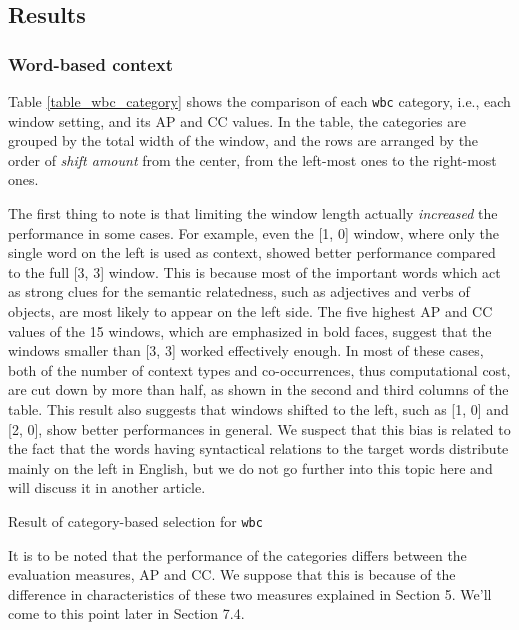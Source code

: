 \documentclass[english]{jnlp_1.4}
\begin{document}
\subsection{Results}

\subsubsection{Word-based context}

Table \ref{table_wbc_category} shows the comparison of each {\tt wbc}
category, i.e., each window setting, and its AP and CC values. In the
table, the categories are grouped by the total width of the window,
and the rows are arranged by the order of {\em shift amount} from the
center, from the left-most ones to the right-most ones.

The first thing to note is that limiting the window length actually
{\em increased} the performance in some cases. For example, even the
[1, 0] window, where only the single word on the left is used as
context, showed better performance compared to the full [3, 3] window.
This is because most of the important words which act as strong clues
for the semantic relatedness, such as adjectives and verbs of objects,
are most likely to appear on the left side. The five highest AP and CC
values of the 15 windows, which are emphasized in bold faces, suggest
that the windows smaller than [3, 3] worked effectively enough. In
most of these cases, both of the number of context types and
co-occurrences, thus computational cost, are cut down by more than
half, as shown in the second and third columns of the table. This
result also suggests that windows shifted to the left, such as [1, 0]
and [2, 0], show better performances in general. We suspect that this
bias is related to the fact that the words having syntactical
relations to the target words distribute mainly on the left in
English, but we do not go further into this topic here and will
discuss it in another article.


\begin{table}[t]
\caption{Result of category-based selection for {\tt wbc}}
\label{table_wbc_category}
\begin{center}

\end{center}
\end{table}

It is to be noted that the performance of the categories differs
between the evaluation measures, AP and CC. We suppose that this is
because of the difference in characteristics of these two measures
explained in Section 5. We'll come to this point later in Section 7.4.
\end{document}
